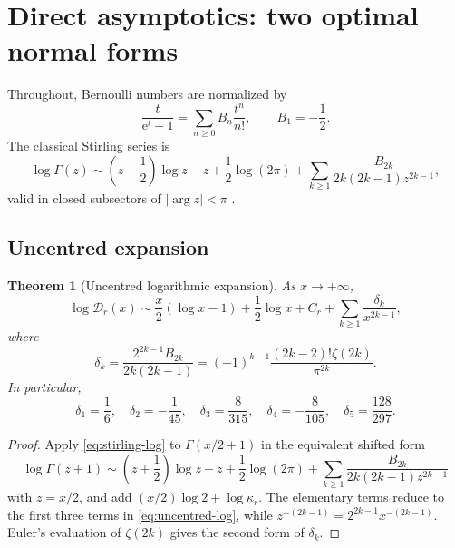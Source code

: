 \documentclass[11pt,a4paper,oneside]{article}
\theoremstyle{plain}
\newtheorem{theorem}{Theorem}[section]
\theoremstyle{definition}
\theoremstyle{remark}
\newcommand{\e}{\mathrm e}
\newcommand{\D}{\mathcal D}
\begin{document}
\section{Direct asymptotics: two optimal normal forms}
\label{sec:direct}

Throughout, Bernoulli numbers are normalized by
\begin{equation}
 \frac{t}{\e^t-1}=\sum_{n\ge0}B_n\frac{t^n}{n!},
 \qquad B_1=-\frac12.
 \label{eq:bernoulli-convention}
\end{equation}
The classical Stirling series is
\begin{equation}
 \log\Gamma(z)
 \sim\left(z-\frac12\right)\log z-z+\frac12\log(2\pi)
 +\sum_{k\ge1}\frac{B_{2k}}{2k(2k-1)z^{2k-1}},
 \label{eq:stirling-log}
\end{equation}
valid in closed subsectors of $|\arg z|<\pi$ \cite{DLMFGamma}.

\subsection{Uncentred expansion}

\begin{theorem}[Uncentred logarithmic expansion]
\label{thm:uncentred-log}
As $x\to+\infty$,
\begin{equation}
 \log\D_r(x)
 \sim \frac{x}{2}(\log x-1)+\frac12\log x+C_r
 +\sum_{k\ge1}\frac{\delta_k}{x^{2k-1}},
 \label{eq:uncentred-log}
\end{equation}
where
\begin{equation}
 \delta_k=\frac{2^{2k-1}B_{2k}}{2k(2k-1)}
 =(-1)^{k-1}\frac{(2k-2)!\zeta(2k)}{\pi^{2k}}.
 \label{eq:delta-def}
\end{equation}
In particular,
\begin{equation}
 \delta_1=\frac16,\quad
 \delta_2=-\frac1{45},\quad
 \delta_3=\frac8{315},\quad
 \delta_4=-\frac8{105},\quad
 \delta_5=\frac{128}{297}.
 \label{eq:delta-first}
\end{equation}
\end{theorem}

\begin{proof}
Apply \cref{eq:stirling-log} to
$\Gamma(x/2+1)$ in the equivalent shifted form
\[
 \log\Gamma(z+1)
 \sim\left(z+\frac12\right)\log z-z+\frac12\log(2\pi)
 +\sum_{k\ge1}\frac{B_{2k}}{2k(2k-1)z^{2k-1}}
\]
with $z=x/2$, and add $(x/2)\log2+\log\kappa_r$.
The elementary terms reduce to the first three terms in
\cref{eq:uncentred-log}, while $z^{-(2k-1)}=2^{2k-1}x^{-(2k-1)}$.
Euler's evaluation of $\zeta(2k)$ gives the second form of $\delta_k$.
\end{proof}
\end{document}
